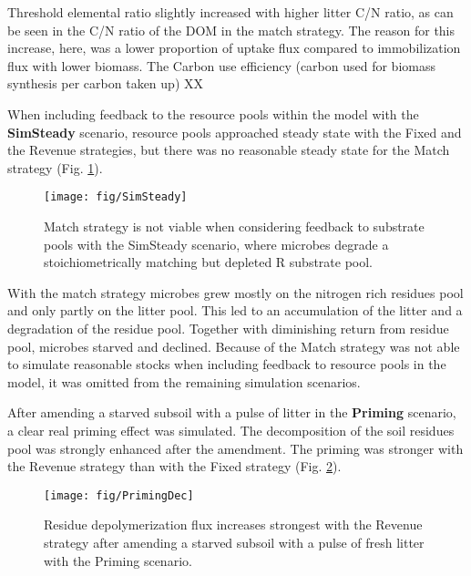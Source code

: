 Threshold elemental ratio slightly increased with higher litter C/N ratio, as
can be seen in the C/N ratio of the DOM in the match strategy. The reason for this
increase, here, was a lower proportion of uptake flux compared to immobilization
flux with lower biomass.
The Carbon use efficiency (carbon used for biomass synthesis per
carbon taken up) XX

When including feedback to the resource pools within the model with the
\textbf{SimSteady} scenario, resource pools approached steady state with the
Fixed and the Revenue strategies, but there was no reasonable steady state for
the Match strategy (Fig. \ref{fig:SimSteady}).

\begin{figure}[t]
\vspace*{2mm}
\begin{center} 
\texttt{[image: fig/SimSteady]} 
\end{center}
\caption{Match strategy is not viable when considering feedback to
substrate pools with the SimSteady scenario, where microbes degrade a
stoichiometrically matching but depleted R substrate pool.
\label{fig:SimSteady}} 
\end{figure}

With the match strategy microbes grew mostly on the
nitrogen rich residues pool and only partly on the litter pool. This led to an
accumulation of the litter and a degradation of the residue pool. Together with
diminishing return from residue pool, microbes starved and declined.
Because of the Match strategy was not able to simulate reasonable
stocks when including feedback to resource pools in the model, it was omitted
from the remaining simulation scenarios.

After amending a starved subsoil with a pulse of litter in the
\textbf{Priming} scenario, a clear real priming effect was simulated. The
decomposition of the soil residues pool was strongly enhanced after the
amendment. The priming was stronger with the Revenue strategy than with the
Fixed strategy (Fig. \ref{fig:PrimingDec}). 

\begin{figure}[t]
\vspace*{2mm}
\begin{center}
\texttt{[image: fig/PrimingDec]}
\end{center}
\caption{Residue depolymerization flux increases strongest with the Revenue
strategy after amending a starved subsoil with a pulse of fresh litter with the
Priming scenario.
\label{fig:PrimingDec}}
\end{figure}

